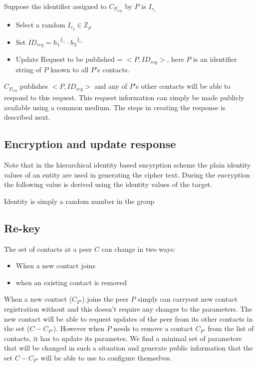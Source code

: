 Suppose the identifier assigned to $C_{P_{req}}$ by $P$ is $I_{r_1}$
\begin{itemize}
\item Select a random $I_{r_2}\in \mathbb{Z}_p$
\item Set $ID_{req} = {h_1}^{I_{r_1}} \cdot {h_2}^{I_{r_2}}$
\item Update Request to be published  = $<P, ID_{req}>$, here $P$ is an identifier string of $P$ known to all $P$'s contacts.
\end{itemize}

$C_{P_{req}}$ publishes $<P, ID_{req}>$ and any of $P$'s other contacts will be able to respond to this request. This request information can simply be made publicly available using a common medium. The steps in creating the response is described next.

\subsection{Encryption and update response}
Note that in the hierarchical identity based encyrption scheme \cite{BBG05} the plain identity values of an entity are used in generating the cipher text. During the encryption the following value is derived using the identity values of the target.

Identity is simply a random number in the group



\subsection{Re-key}
The set of contacts at a peer $C$ can change in two ways:
\begin{itemize}
\item When a new contact joins
\item when an existing contact is removed
\end{itemize}

When a new contact ($C_{P'}$) joins the peer $P$ simply can carryout new contact registration without and this doesn't require any changes to the parameters. The new contact will be able to request updates of the peer from its other contacts in the set ($C - C_{P'}$). 
However when $P$ needs to remove a contact $C_{P'}$ from the list of contacts, it has to update its parametes. We find a minimal set of parameters that will be changed in such a situation and generate public information that the set $C - C_{P'}$ will be able to use to configure themselves.

